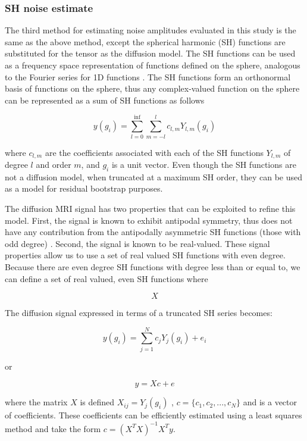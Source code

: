 \subsubsection{SH noise estimate}
The third method for estimating noise amplitudes evaluated in this study
is the same as the above method, except the spherical harmonic (SH)
functions are substituted for the tensor as the diffusion model. The SH
functions can be used as a frequency space representation of functions
defined on the sphere, analogous to the Fourier series for 1D
functions \cite{Hess_2006}. The SH functions form an orthonormal basis of
functions on the sphere, thus any complex-valued function on the sphere
can be represented as a sum of SH functions as follows

\begin{equation}
y(g_i) = \sum_{l=0}^{\inf} \sum_{m=-l}^l{c_{l,m}Y_{l,m}(g_i)}
\end{equation}

where $c_{l,m}$ are the coefficients associated with each of the SH functions $Y_{l,m}$ of degree $l$ and order $m$, and $g_i$ is a unit vector. Even though the SH functions
are not a diffusion model, when truncated at a maximum SH order, they
can be used as a model for residual bootstrap purposes.

The diffusion MRI signal has two properties that can be exploited to
refine this model. First, the signal is known to exhibit antipodal
symmetry, thus does not have any contribution from the antipodally
asymmetric SH functions (those with odd degree) \cite{17911030}.
Second, the signal is known to be real-valued. These signal properties
allow us to use a set of real valued SH functions with even degree.
Because there are even degree SH functions with degree less than or
equal to, we can define a set of real valued, even SH functions where

\begin{equation}
X
\end{equation}

The diffusion signal expressed in terms of a truncated SH series becomes:

\begin{equation}
y(g_i) = \sum_{j=1}^N{c_jY_j(g_i) + e_i}
\end{equation}

or

\begin{equation}
y = Xc + e
\end{equation}

where the matrix $X$ is defined $X_{ij} = Y_j(g_i)$ , $c = \{c_1, c_2, ..., c_N\}$ and is a vector of coefficients. These
coefficients can be efficiently estimated using a least squares method
and take the form $c = (X^TX)^{-1}X^Ty$.

